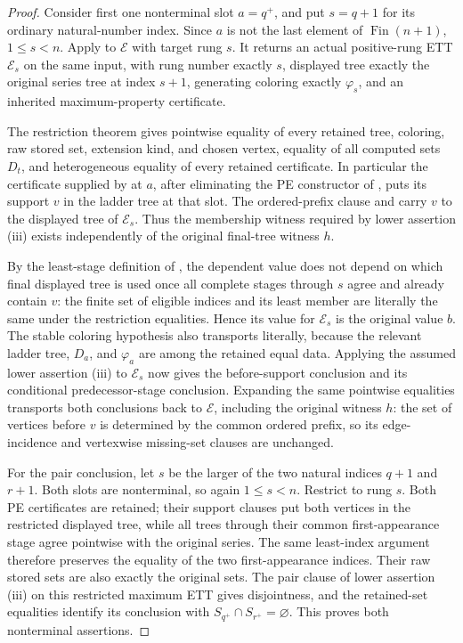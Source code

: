 \begin{proof}
Consider first one nonterminal slot \(a=q^+\), and put \(s=q+1\) for its
ordinary natural-number index.  Since \(a\) is not the last element of
\(\operatorname{Fin}(n+1)\), \(1\le s<n\).  Apply
 to \(\mathcal E\) with target rung \(s\).
It returns an actual positive-rung ETT \(\mathcal E_s\) on the same input,
with rung number exactly \(s\), displayed tree exactly the original series
tree at index \(s+1\), generating coloring exactly \(\varphi_s\), and an
inherited maximum-property certificate.

The restriction theorem gives pointwise equality of every retained tree,
coloring, raw stored set, extension kind, and chosen vertex, equality of all
computed sets \(D_t\), and heterogeneous equality of every retained
certificate.  In particular the certificate supplied by
 at \(a\), after eliminating the PE constructor of
, puts its support \(v\) in the ladder tree at
that slot.  The ordered-prefix clause and
 carry \(v\) to the displayed tree of
\(\mathcal E_s\).  Thus the membership witness required by lower assertion
(iii) exists independently of the original final-tree witness \(h\).

By the least-stage definition of , the
dependent value does not depend on which final displayed tree is used once
all complete stages through \(s\) agree and already contain \(v\): the
finite set of eligible indices and its least member are literally the same
under the restriction equalities.  Hence its value for \(\mathcal E_s\) is
the original value \(b\).  The stable coloring hypothesis also transports
literally, because the relevant ladder tree, \(D_a\), and \(\varphi_a\) are
among the retained equal data.  Applying the assumed lower assertion (iii)
to \(\mathcal E_s\) now gives the before-support conclusion and its
conditional predecessor-stage conclusion.  Expanding the same pointwise
equalities transports both conclusions back to \(\mathcal E\), including
the original witness \(h\): the set of vertices before \(v\) is determined
by the common ordered prefix, so its edge-incidence and vertexwise
missing-set clauses are unchanged.

For the pair conclusion, let \(s\) be the larger of the two natural indices
\(q+1\) and \(r+1\).  Both slots are nonterminal, so again \(1\le s<n\).
Restrict to rung \(s\).  Both PE certificates are retained; their support
clauses put both vertices in the restricted displayed tree, while all trees
through their common first-appearance stage agree pointwise with the
original series.  The same least-index argument therefore preserves the
equality of the two first-appearance indices.  Their raw stored sets are
also exactly the original sets.  The pair clause of lower assertion (iii)
on this restricted maximum ETT gives disjointness, and the retained-set
equalities identify its conclusion with \(S_{q^+}\cap S_{r^+}=\varnothing\).
This proves both nonterminal assertions.
\end{proof}

